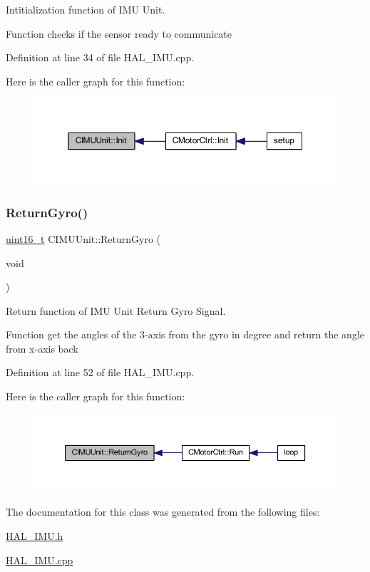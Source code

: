 Intitialization function of I\+MU Unit. 

Function checks if the sensor ready to communicate 

Definition at line 34 of file H\+A\+L\+\_\+\+I\+M\+U.\+cpp.

Here is the caller graph for this function\+:
\nopagebreak
\begin{figure}[H]
\begin{center}
\leavevmode
\includegraphics[width=350pt]{class_c_i_m_u_unit_a589ccc2afbaadbdf9dbef34c5025a42f_icgraph}
\end{center}
\end{figure}
\mbox{\label{class_c_i_m_u_unit_a396b045fac007e169289409ca213ac39}} 
\subsubsection{\texorpdfstring{Return\+Gyro()}{ReturnGyro()}}
{\footnotesize\ttfamily \mbox{\hyperlink{_a_d_a_s___types_8h_a1f1825b69244eb3ad2c7165ddc99c956}{uint16\+\_\+t}} C\+I\+M\+U\+Unit\+::\+Return\+Gyro (\begin{DoxyParamCaption}\item[{void}]{ }\end{DoxyParamCaption})}



Return function of I\+MU Unit Return Gyro Signal. 

Function get the angles of the 3-\/axis from the gyro in degree and return the angle from x-\/axis back 

Definition at line 52 of file H\+A\+L\+\_\+\+I\+M\+U.\+cpp.

Here is the caller graph for this function\+:
\nopagebreak
\begin{figure}[H]
\begin{center}
\leavevmode
\includegraphics[width=350pt]{class_c_i_m_u_unit_a396b045fac007e169289409ca213ac39_icgraph}
\end{center}
\end{figure}


The documentation for this class was generated from the following files\+:\begin{DoxyCompactItemize}
\item 
\mbox{\hyperlink{_h_a_l___i_m_u_8h}{H\+A\+L\+\_\+\+I\+M\+U.\+h}}\item 
\mbox{\hyperlink{_h_a_l___i_m_u_8cpp}{H\+A\+L\+\_\+\+I\+M\+U.\+cpp}}\end{DoxyCompactItemize}
